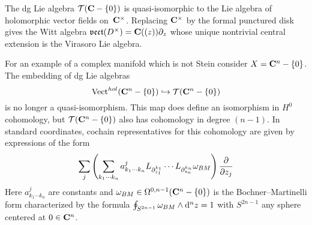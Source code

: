 \documentclass[11pt]{amsart}
\renewcommand{\op}{\operatorname}
\begin{document}
%
%
%

The dg Lie algebra $\mathcal T(\mathbf{C} - \{0\})$ is quasi-isomorphic to the Lie algebra of holomorphic vector fields on~$\mathbf{C}^\times$.
Replacing $\mathbf{C}^\times$ by the formal punctured disk gives the Witt algebra $\mathfrak{vect}(D^\times) = \mathbf{C}((z)) \partial_z$ whose unique nontrivial central extension is the Virasoro Lie algebra.

For an example of a complex manifold which is not Stein consider $X = \mathbf{C}^n - \{0\}$.
The embedding of dg Lie algebras
\begin{equation}
{\rm Vect}^{hol}(\mathbf{C}^n - \{0\}) \hookrightarrow \mathcal T(\mathbf{C}^n - \{0\})
\end{equation}
is no longer a quasi-isomorphism.
This map does define an isomorphism in $H^0$ cohomology, but $\mathcal T(\mathbf{C}^n-\{0\})$ also has cohomology in degree $(n-1)$. 
In standard coordinates, cochain representatives for this cohomology are given by expressions of the form
\begin{equation}
\sum_j \left(\sum_{k_1 \cdots k_n} a^j_{k_1\cdots k_n} L_{\partial_{z_1}^{k_1}} \cdots L_{\partial_{z_n}^{k_n}} \omega_{BM}\right) \frac{\partial}{\partial z_j} 
\end{equation}
Here $a^j_{k_1\cdots k_n}$ are constants and $\omega_{BM} \in \Omega^{0,n-1}(\mathbf{C}^n-\{0\})$ is the Bochner--Martinelli form characterized by the formula $\oint_{S^{2n-1}} \omega_{BM} \wedge {\rm d}^n z= 1$ with $S^{2n-1}$ any sphere centered at $0 \in \mathbf{C}^n$.
\end{document}
